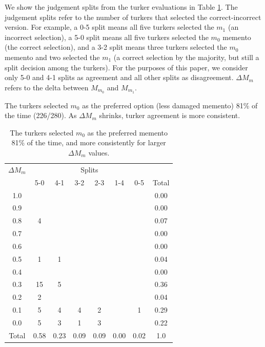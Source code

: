 We show the judgement splits from the turker evaluations in Table \ref{m0table}. The judgement splits refer to the number of turkers that selected the correct-incorrect version. For example, a 0-5 split means all five turkers selected the $m_1$ (an incorrect selection), a 5-0 split means all five turkers selected the $m_0$ memento (the correct selection), and a 3-2 split means three turkers selected the $m_0$ memento and two selected the $m_1$ (a correct selection by the majority, but still a split decision among the turkers). For the purposes of this paper, we consider only 5-0 and 4-1 splits as agreement and all other splits as disagreement. {$\Delta M_m$} refers to the delta between $M_{m_0}$ and $M_{m_1}$.

The turkers selected $m_0$ as the preferred option (less damaged memento) 81\% of the time (226/280). As {$\Delta M_m$} shrinks, turker agreement is more consistent. 


\begin{table}
\begin{tabular}{ c | c | c | c | c | c | c || c}
    {$\Delta M_m$} &  \multicolumn{6}{c}{Splits}\\
  & 5-0 & 4-1 & 3-2 & 2-3 & 1-4 & 0-5 & Total\\
\hline
1.0   &  &  &  &  &  & & 0.00\\
0.9 &  &  &  &  &  & & 0.00\\
0.8 & 4 &  &  &  &  & & 0.07\\
0.7 &  &  &  &  &  & & 0.00\\
0.6 &  &  &  &  &  & & 0.00\\
0.5 & 1 & 1 &  &  &  & & 0.04\\
0.4 &  &  &  &  &  & & 0.00\\
0.3 & 15 & 5 &  &  &  & & 0.36\\
0.2 & 2 &  &  &  &  & & 0.04\\
0.1 & 5 & 4 & 4 & 2 &  & 1& 0.29\\
0.0 & 5 & 3 & 1 & 3 &  & & 0.22\\
\hline
Total & 0.58 & 0.23 & 0.09 & 0.09 & 0.00 & 0.02 & 1.0
\end{tabular}
  \caption{The turkers selected $m_0$ as the preferred memento 81\% of the time, and more consistently for larger {$\Delta M_m$} values.}
  \label{m0table}
\end{table}

